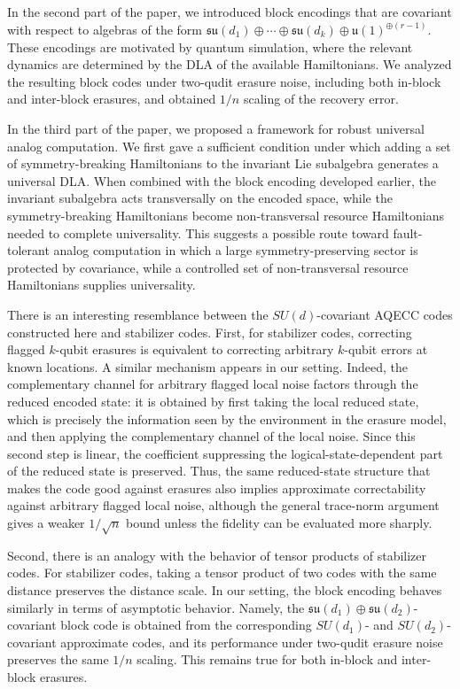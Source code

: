 \documentclass[10pt,twocolumn,superscriptaddress,aps,amsmath,amssymb,citeautoscript,floatfix,prx]{revtex4-2}
\newcounter{alg}
\theoremstyle{plain}
\theoremstyle{plain}
\theoremstyle{plain}
\theoremstyle{plain}
\theoremstyle{plain}
\theoremstyle{plain}
\theoremstyle{plain}
\theoremstyle{definition}
\theoremstyle{plain}
\begin{document}
In the second part of the paper, we introduced block encodings that are covariant with respect to algebras of the form
$
    \mathfrak{su}(d_1)\oplus\cdots\oplus\mathfrak{su}(d_k)
    \oplus
    \mathfrak{u}(1)^{\oplus(r-1)}.
$
These encodings are motivated by quantum simulation, where the relevant dynamics are determined by the DLA of the available
Hamiltonians. We analyzed the resulting block codes under two-qudit erasure noise, including both in-block and inter-block erasures, and obtained \(1/n\) scaling 
of the recovery error.

In the third part of the paper, we proposed a framework for robust universal analog computation. We first gave a sufficient condition under which adding a set of symmetry-breaking 
Hamiltonians to the invariant Lie subalgebra generates a universal DLA. When combined with the block encoding developed
earlier, the invariant subalgebra acts transversally on the encoded space, while the symmetry-breaking Hamiltonians become non-transversal resource Hamiltonians needed to complete universality. 
This suggests a possible route toward fault-tolerant analog computation in which a large symmetry-preserving sector is protected by covariance, while a controlled
set of non-transversal resource Hamiltonians supplies universality.

There is an interesting resemblance between the \(SU(d)\)-covariant AQECC codes constructed here and stabilizer codes. 
First, for stabilizer codes, correcting flagged \(k\)-qubit erasures is equivalent to correcting arbitrary \(k\)-qubit errors at known locations. A similar mechanism
appears in our setting. Indeed, the complementary channel for arbitrary flagged local noise factors through the reduced encoded state: it is obtained by first taking the local reduced state, 
which is precisely the information seen by the environment in the erasure model, and then applying the complementary channel of
the local noise. Since this second step is linear, the coefficient suppressing the logical-state-dependent part of the reduced state is preserved. 
Thus, the same reduced-state structure that makes the code good against erasures also implies approximate correctability against arbitrary flagged local noise, although the general trace-norm argument gives a weaker \(1/\sqrt n\) bound unless the
fidelity can be evaluated more sharply.

Second, there is an analogy with the behavior of tensor products of stabilizer codes. For stabilizer codes, taking a tensor product of two codes with 
the same distance preserves the distance scale. In our setting, the block encoding behaves similarly in terms of asymptotic behavior. Namely, the
\(\mathfrak{su}(d_1)\oplus\mathfrak{su}(d_2)\)-covariant block code is obtained from the corresponding \(SU(d_1)\)- and \(SU(d_2)\)-covariant approximate codes, 
and its performance under two-qudit erasure noise preserves the same \(1/n\)
scaling. This remains true for both in-block and inter-block erasures.
\end{document}
